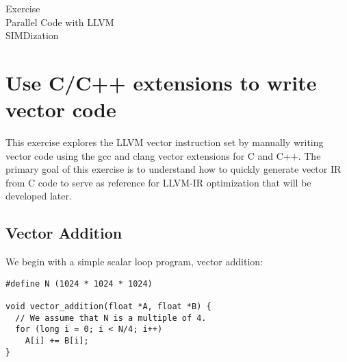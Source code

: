 \documentclass[12pt]{article}
\begin{document}
{
\centering
\Huge{
Exercise\\
Parallel Code with LLVM\\
SIMDization\\
}}

\section {Use C/C++ extensions to write vector code}

This exercise explores the LLVM vector instruction set by manually writing
vector code using the gcc and clang vector extensions for C and C++. The
primary goal of this exercise is to understand how to quickly generate vector
IR from C code to serve as reference for LLVM-IR optimization that will be
developed later.

\subsection{Vector Addition}
We begin with a simple scalar loop program, vector addition:

\begin{verbatim}
#define N (1024 * 1024 * 1024)

void vector_addition(float *A, float *B) {
  // We assume that N is a multiple of 4.
  for (long i = 0; i < N/4; i++)
    A[i] += B[i];
}
\end{verbatim}
\end{document}

